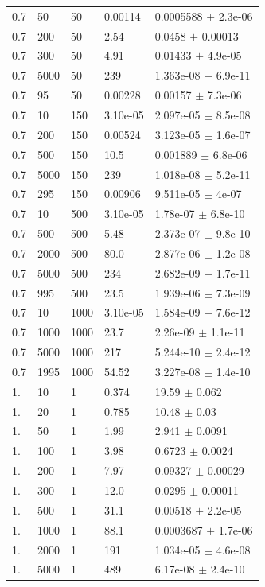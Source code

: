 \begin{longtable}{lllll}
	0.7 & 50 & 50 & 0.00114 & 0.0005588 $\pm$ 2.3e-06 \\
	0.7 & 200 & 50 & 2.54 & 0.0458 $\pm$ 0.00013 \\
	0.7 & 300 & 50 & 4.91 & 0.01433 $\pm$ 4.9e-05 \\
	0.7 & 5000 & 50 & 239 & 1.363e-08 $\pm$ 6.9e-11 \\
	0.7 & 95 & 50 & 0.00228 & 0.00157 $\pm$ 7.3e-06 \\
	0.7 & 10 & 150 & 3.10e-05 & 2.097e-05 $\pm$ 8.5e-08 \\
	0.7 & 200 & 150 & 0.00524 & 3.123e-05 $\pm$ 1.6e-07 \\
	0.7 & 500 & 150 & 10.5 & 0.001889 $\pm$ 6.8e-06 \\
	0.7 & 5000 & 150 & 239 & 1.018e-08 $\pm$ 5.2e-11 \\
	0.7 & 295 & 150 & 0.00906 & 9.511e-05 $\pm$ 4e-07 \\
	0.7 & 10 & 500 & 3.10e-05 & 1.78e-07 $\pm$ 6.8e-10 \\
	0.7 & 500 & 500 & 5.48 & 2.373e-07 $\pm$ 9.8e-10 \\
	0.7 & 2000 & 500 & 80.0 & 2.877e-06 $\pm$ 1.2e-08 \\
	0.7 & 5000 & 500 & 234 & 2.682e-09 $\pm$ 1.7e-11 \\
	0.7 & 995 & 500 & 23.5 & 1.939e-06 $\pm$ 7.3e-09 \\
	0.7 & 10 & 1000 & 3.10e-05 & 1.584e-09 $\pm$ 7.6e-12 \\
	0.7 & 1000 & 1000 & 23.7 & 2.26e-09 $\pm$ 1.1e-11 \\
	0.7 & 5000 & 1000 & 217 & 5.244e-10 $\pm$ 2.4e-12 \\
	0.7 & 1995 & 1000 & 54.52 & 3.227e-08 $\pm$ 1.4e-10 \\
	1. & 10 & 1 & 0.374 & 19.59 $\pm$ 0.062 \\
	1. & 20 & 1 & 0.785 & 10.48 $\pm$ 0.03 \\
	1. & 50 & 1 & 1.99 & 2.941 $\pm$ 0.0091 \\
	1. & 100 & 1 & 3.98 & 0.6723 $\pm$ 0.0024 \\
	1. & 200 & 1 & 7.97 & 0.09327 $\pm$ 0.00029 \\
	1. & 300 & 1 & 12.0 & 0.0295 $\pm$ 0.00011 \\
	1. & 500 & 1 & 31.1 & 0.00518 $\pm$ 2.2e-05 \\
	1. & 1000 & 1 & 88.1 & 0.0003687 $\pm$ 1.7e-06 \\
	1. & 2000 & 1 & 191 & 1.034e-05 $\pm$ 4.6e-08 \\
	1. & 5000 & 1 & 489 & 6.17e-08 $\pm$ 2.4e-10 \\

\end{longtable}
